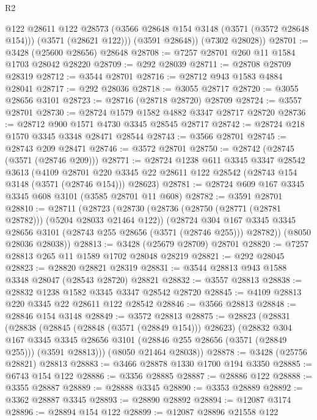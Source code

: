 \begin{lexlean}{R2}
\begin{coremodule}
          @122
          @28611
          @122
          @28573
          (@3566 @28648 @154 @3148 (@3571 (@3572 @28648 @154)))
          (@3571 (@28621 @122)))
        (@3591 @28648))
      (@7302 @28028))
@28701 := @3428 (@25600 @28656) @28648
@28708 := @7257 @28701 @260 @11 @1584 @1703 @28042 @28220
@28709 := @292 @28039
@28711 := @28708 @28709 @28319
@28712 := @3544 @28701
@28716 := @28712 @943 @1583 @4884 @28041
@28717 := @292 @28036
@28718 := @3055 @28717
@28720 := @3055 @28656 @3101
@28723 := @28716 (@28718 @28720) @28709
@28724 := @3557 @28701
@28730 := @28724 @1579 @1582 @4882 @3347 @28717 @28720
@28736 := @28712 @900 @1571 @4730 @3345 @28545 @28717
@28742 := @28724 @218 @1570 @3345 @3348 @28471 @28544
@28743 := @3566 @28701
@28745 := @28743 @209 @28471
@28746 := @3572 @28701
@28750 := @28742 (@28745 (@3571 (@28746 @209)))
@28771 := @28724
    @1238
    @611
    @3345
    @3347
    @28542
    @3613
    (@4109
      @28701
      @220
      @3345
      @22
      @28611
      @122
      @28542
      (@28743 @154 @3148 (@3571 (@28746 @154)))
      @28623)
@28781 := @28724 @609 @167 @3345 @3345 @608 @3101 (@3585 @28701 @11 @608)
@28782 := @3591 @28701
@28810 := @28711
    (@28723
      (@28730
        (@28736 (@28750 (@28771 (@28781 @28782))) (@5204 @28033 @21464 @122))
        (@28724
          @304
          @167
          @3345
          @3345
          @28656
          @3101
          (@28743 @255 @28656 (@3571 (@28746 @255)))
          @28782))
      (@8050 @28036 @28038))
@28813 := @3428 (@25679 @28709) @28701
@28820 := @7257 @28813 @265 @11 @1589 @1702 @28048 @28219
@28821 := @292 @28045
@28823 := @28820 @28821 @28319
@28831 := @3544 @28813 @943 @1588 @3348 @28047 (@28543 @28720) @28821
@28832 := @3557 @28813
@28838 := @28832 @1238 @1582 @3345 @3347 @28542 @28720
@28845 := @4109 @28813 @220 @3345 @22 @28611 @122 @28542
@28846 := @3566 @28813
@28848 := @28846 @154 @3148
@28849 := @3572 @28813
@28875 := @28823
    (@28831
      (@28838
        (@28845 (@28848 (@3571 (@28849 @154))) @28623)
        (@28832
          @304
          @167
          @3345
          @3345
          @28656
          @3101
          (@28846 @255 @28656 (@3571 (@28849 @255)))
          (@3591 @28813)))
      (@8050 @21464 @28038))
@28878 := @3428 (@25756 @28821) @28813
@28883 := @3466 @28878 @1330 @1700 @194 @3350
@28885 := @6743 @154 @122
@28886 := @3356 @28885
@28887 := @28886 @122
@28888 := @3355 @28887
@28889 := @28888 @3345
@28890 := @3353 @28889
@28892 := @3362 @28887 @3345
@28893 := @28890 @28892
@28894 := @12087 @3174
@28896 := @28894 @154 @122
@28899 := @12087 @28896 @21558 @122

\end{coremodule}
\end{lexlean}
